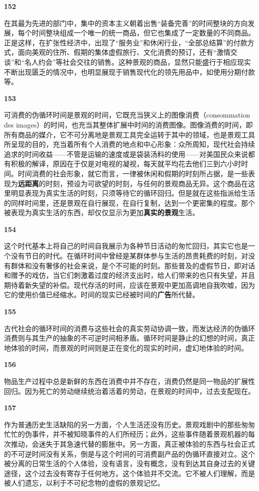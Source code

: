 \documentclass[fontset=fandol, a4paper, 12pt, openright]{ctexbook}
\makeatletter
\newcommand{\thesis}[1]{%
    \par\vspace{1.5em}%
    {\centering \textbf{\Large #1}\par}%
    \nobreak\vspace{0.5em}\nobreak
    \@afterindenttrue %
    \@afterheading    %
}
\makeatother
\begin{document}
\thesis{152}
在其最为先进的部门中，集中的资本主义朝着出售“装备完善”的时间整块的方向发展，每个时间整块组成一个唯一的统一商品，但它也集成了一定数量的不同商品。正是这样，在扩张性经济中，出现了“服务业”和休闲行业，“全部总结算”的付款方式，面向美观的住所、假期的集体虚假旅行、文化消费的预订，还有“激情交谈”和“名人约会”等社会交往的销售。这种景观的商品，显然只能盛行于相应现实不断出现匮乏的情况中，也明显展现于销售现代化的领先用品中，如使用分期付款等。

\thesis{153}
可消费的伪循环时间是景观的时间，它既充当狭义上的图像消费（consommation des images）的时间，也充当其整体扩展中时间的消费图像。图像消费的时间，即所有商品的媒介，它不可分离地是景观工具完全运转于其中的领域，也是景观工具所呈现的目的，充当着所有个人消费的地点和中心形象：众所周知，现代社会持续追求的时间收益——不管是运输的速度或是袋装汤料的使用——对美国民众来说都有积极的解译，原因在于仅是对电视的凝视，每天就平均花去他们三到六小时时间。时间消费的社会形象，就它而言，一律被休闲和假期的时刻所占据，是一些表现为\textbf{远距离}的时刻，预设为可欲望的时刻，与任何的景观商品无异。这个商品在这里明显表现为真实生活的时刻，只须等待它的循环回归。但是就在这些指派给生活的同样时间里，还是景观在自行展现，在自行复制，达到一个更密集的程度。那个被表现为真实生活的东西，却仅仅显示为更加\textbf{真实的景观}生活。

\thesis{154}
这个时代基本上将自己的时间自我展示为各种节日活动的匆忙回归，其实它也是一个没有节日的时代。在循环时间中曾经是某群体参与生活的昂贵耗费的时刻，对没有群体和没有奢侈的社会来说，是个不可能的时刻。那些普及的虚假节日，即对话和赠予的戏仿，当它们刺激着过度的经济支出时，给人们带来的也只有失望，并且期待着新失望的补偿。现代存活的时间，应该在景观中更加高调地自我吹嘘，因为它的使用价值已经缩水。时间的现实已经被时间的\textbf{广告}所代替。

\thesis{155}
古代社会的循环时间的消费与这些社会的真实劳动协调一致，而发达经济的伪循环消费则与其生产的抽象的不可逆时间相矛盾。循环时间是静止的幻想的时间，真正地体验的时间，而景观的时间则是正在变化的现实的时间，虚幻地体验的时间。

\thesis{156}
物品生产过程中总是新鲜的东西在消费中并不存在，消费仍然是同一物品的扩展性回归。因为死亡的劳动继续统治着活着的劳动，在景观的时间中，过去支配现在。

\thesis{157}
作为普通历史生活缺陷的另一方面，个人生活还没有历史。景观戏剧中的那些匆匆忙忙的伪事件，并不被知晓事件的人们所经历；此外，这些事件随着景观机器的每次推动，会迷失于其急速代替的膨胀中。另一方面，真正被体验的东西与社会正式的不可逆时间没有关系，倒是与这个时间的可消费副产品的伪循环直接对立。这个被分离的日常生活的个人体验，没有语言，没有概念，没有到达其自身过去的关键途径，这个过去没有寄存于任何地方。这个体验并不交流。它不被人们理解，而是被人们遗忘，以利于不可纪念物的虚假的景观记忆。
\end{document}
